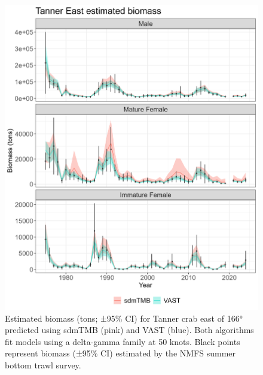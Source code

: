 \documentclass[
]{article}
\begin{document}
\begin{figure}

{\centering \includegraphics[width=1\linewidth,height=1\textheight]{../BAIRDI/Figures/TannerE.biomass.sdmTMBVASTindex} 

}

\caption{Estimated biomass (tons; ±95\% CI) for Tanner crab east of 166° predicted using sdmTMB (pink) and VAST (blue). Both algorithms fit models using a delta-gamma family at 50 knots. Black points represent biomass (±95\% CI) estimated by the NMFS summer bottom trawl survey.}\label{fig:Eastbairdi-bio-compare}
\end{figure}
\end{document}
